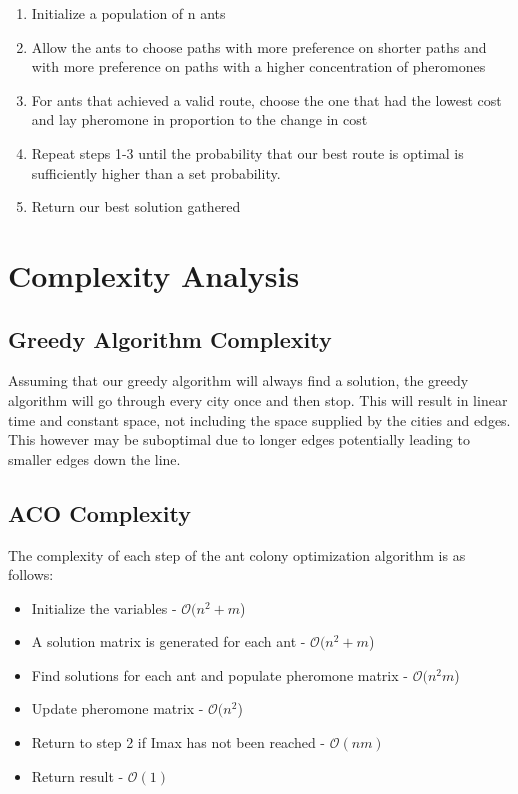 \begin{enumerate}
  \item Initialize a population of n ants
  \item Allow the ants to choose paths with more preference on shorter paths and with more preference on paths with a higher concentration of pheromones
  \item For ants that achieved a valid route, choose the one that had the lowest cost and lay pheromone in proportion to the change in cost
  \item Repeat steps 1-3 until the probability that our best route is optimal is sufficiently higher than a set probability.
  \item Return our best solution gathered
\end{enumerate}

\section{Complexity Analysis}
\subsection*{Greedy Algorithm Complexity}
Assuming that our greedy algorithm will always find a solution, the greedy algorithm will go through
every city once and then stop. This will result in linear time and constant space, not including the
space supplied by the cities and edges. This however may be suboptimal due to longer edges potentially
leading to smaller edges down the line.

\subsection*{ACO Complexity}
The complexity of each step of the ant colony optimization algorithm is as follows: 
\begin{itemize}
  \item Initialize the variables - $\mathcal{O}(n^2 + m$)
  \item A solution matrix is generated for each ant - $\mathcal{O}(n^2 + m$)
  \item Find solutions for each ant and populate pheromone matrix - $\mathcal{O}(n^2m$)
  \item Update pheromone matrix - $\mathcal{O}(n^2$)
  \item Return to step 2 if Imax has not been reached - $\mathcal{O}(nm)$
  \item Return result - $\mathcal{O}(1)$
\end{itemize}

